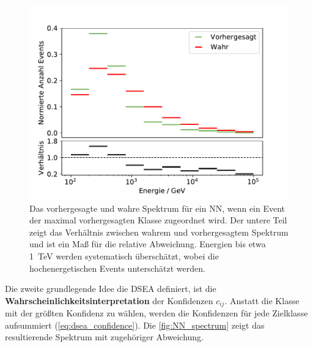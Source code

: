 \begin{figure}
    \centering
    \includegraphics[width=\textwidth]{Plots/NN/spectrum_hard_10bins_50ep_500000samples_200pulls.pdf}
    \caption[Spektrum des NN ohne DSEA bei einer Klassifikation nach dem "`maximum a posterioro"'-Prinzip]{Das vorhergesagte und wahre Spektrum für ein NN, wenn ein Event der maximal vorhergesagten Klasse zugeordnet wird.
    Der untere Teil zeigt das Verhältnis zwischen wahrem und vorhergesagtem Spektrum und ist ein Maß für die relative Abweichung.
    Energien bis etwa \SI{1}{\tera\electronvolt} werden systematisch überschätzt, wobei die hochenergetischen Events unterschätzt werden.
    }
    \label{fig:NN_spectrum_hard}
\end{figure}
Die zweite grundlegende Idee die DSEA definiert, ist die \textbf{Wahrscheinlichkeitsinterpretation} der Konfidenzen $c_{ij}$.
Anstatt die Klasse mit der größten Konfidenz zu wählen, werden die Konfidenzen für jede Zielklasse aufsummiert (\autoref{eq:dsea_confidence}).
Die \autoref{fig:NN_spectrum} zeigt das resultierende Spektrum mit zugehöriger Abweichung.
